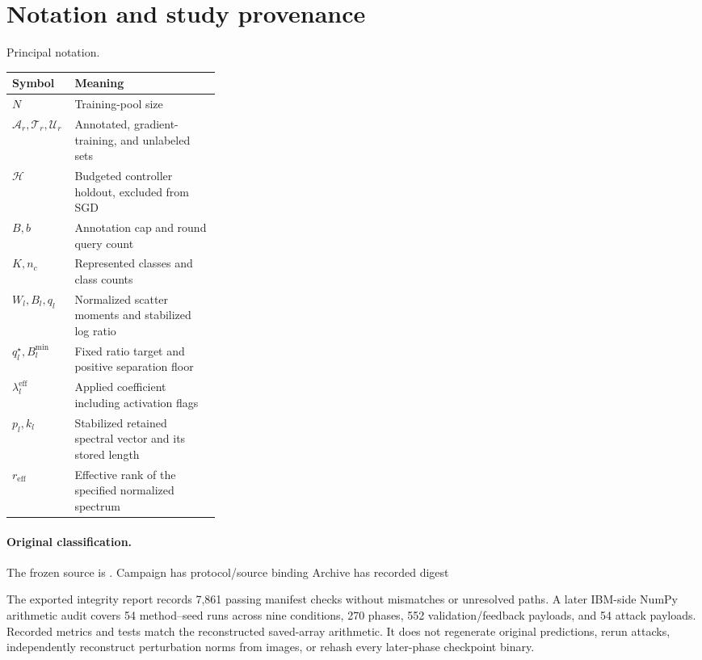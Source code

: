 \section{Notation and study provenance}\label{app:provenance}

\begin{placedtable}
\caption{Principal notation.}
\centering\small
\begin{tabularx}{\linewidth}{@{}p{0.30\linewidth}Y@{}}
\toprule
Symbol & Meaning \\
\midrule
$N$ & Training-pool size \\
$\mathcal A_r,\mathcal T_r,\mathcal U_r$ &
Annotated, gradient-training, and unlabeled sets \\
$\mathcal H$ & Budgeted controller holdout, excluded from SGD \\
$B,b$ & Annotation cap and round query count \\
$K,n_c$ & Represented classes and class counts \\
$W_l,B_l,q_l$ & Normalized scatter moments and stabilized log ratio \\
$q_l^\star,B_l^{\min}$ & Fixed ratio target and positive separation floor \\
$\lambda_l^{\mathrm{eff}}$ & Applied coefficient including activation flags \\
$p_l,k_l$ & Stabilized retained spectral vector and its stored length \\
$r_{\mathrm{eff}}$ & Effective rank of the specified normalized spectrum \\
\bottomrule
\end{tabularx}
\end{placedtable}

\paragraph{Original classification.}
The frozen source is .
Campaign 
has protocol/source binding
Archive  has recorded digest

The exported integrity report records 7,861 passing manifest
checks without mismatches or unresolved paths.
A later IBM-side NumPy arithmetic audit covers 54 method--seed runs
across nine conditions,
270 phases, 552 validation/feedback payloads, and 54 attack
payloads. Recorded metrics and tests match the reconstructed
saved-array arithmetic.
It does not regenerate original predictions, rerun attacks,
independently reconstruct perturbation norms from images,
or rehash every later-phase checkpoint binary.


